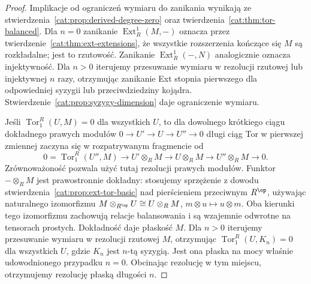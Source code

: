 \begin{proof}
Implikacje od ograniczeń wymiaru do zanikania wynikają ze stwierdzenia~\ref{cat:prop:derived-degree-zero} oraz twierdzenia~\ref{cat:thm:tor-balanced}. Dla $n=0$ zanikanie $\operatorname{Ext}_R^1(M,-)$ oznacza przez twierdzenie~\ref{cat:thm:ext-extensions}, że wszystkie rozszerzenia kończące się $M$ są rozkładalne; jest to rzutowość. Zanikanie $\operatorname{Ext}_R^1(-,N)$ analogicznie oznacza injektywność. Dla $n>0$ iterujemy przesuwanie wymiaru w rezolucji rzutowej lub injektywnej $n$ razy, otrzymując zanikanie Ext stopnia pierwszego dla odpowiedniej syzygii lub przeciwdziedziny kojądra. Stwierdzenie~\ref{cat:prop:syzygy-dimension} daje ograniczenie wymiaru.

Jeśli $\operatorname{Tor}_1^R(U,M)=0$ dla wszystkich $U$, to dla dowolnego krótkiego ciągu dokładnego prawych modułów $0\to U'\to U\to U''\to0$ długi ciąg Tor w pierwszej zmiennej zaczyna się w rozpatrywanym fragmencie od
\[
 0=\operatorname{Tor}_1^R(U'',M)\to U'\otimes_R M
 \to U\otimes_R M\to U''\otimes_R M\to0 .
\]
Zrównoważoność pozwala użyć tutaj rezolucji prawych modułów. Funktor $-\otimes_R M$ jest prawostronnie dokładny: stosujemy sprzężenie z dowodu stwierdzenia~\ref{cat:prop:ext-tor-basic} nad pierścieniem przeciwnym $R^{\op}$, używając naturalnego izomorfizmu $M\otimes_{R^{\op}}U\cong U\otimes_R M$, $m\otimes u\mapsto u\otimes m$. Oba kierunki tego izomorfizmu zachowują relacje balansowania i są wzajemnie odwrotne na tensorach prostych. Dokładność daje płaskość $M$. Dla $n>0$ iterujemy przesuwanie wymiaru w rezolucji rzutowej $M$, otrzymując $\operatorname{Tor}_1^R(U,K_n)=0$ dla wszystkich $U$, gdzie $K_n$ jest $n$-tą syzygią. Jest ona płaska na mocy właśnie udowodnionego przypadku $n=0$. Obcinając rezolucję w tym miejscu, otrzymujemy rezolucję płaską długości $n$.
\end{proof}

